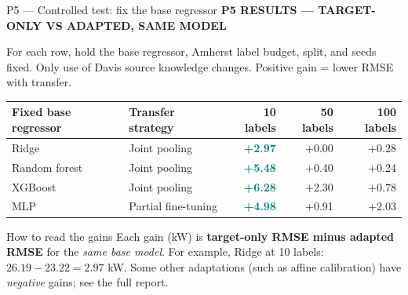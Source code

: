 \documentclass[aspectratio=169,11pt]{beamer}
\newcommand{\sectiontag}[1]{{\footnotesize\usebeamercolor[fg]{structure}\textbf{#1}}\par\vspace{0.10cm}}
\newcommand{\smallmuted}[1]{{\footnotesize\color{slate}#1\par}}
\begin{document}
\begin{frame}{P5 — Controlled test: fix the base regressor}
\sectiontag{P5 \quad RESULTS — TARGET-ONLY VS ADAPTED, SAME MODEL}
\smallmuted{For each row, hold the base regressor, Amherst label budget, split, and seeds fixed. Only use of Davis source knowledge changes. Positive gain = lower RMSE with transfer.}
\vspace{0.17cm}
{\footnotesize\setlength{\tabcolsep}{8pt}\renewcommand{\arraystretch}{1.44}
\begin{tabular}{@{}llrrr@{}}\toprule
\textbf{Fixed base regressor} & \textbf{Transfer strategy} & \textbf{10 labels} & \textbf{50 labels} & \textbf{100 labels}\\\midrule
Ridge & Joint pooling & \textcolor{teal}{\textbf{+2.97}} & +0.00 & +0.28\\
Random forest & Joint pooling & \textcolor{teal}{\textbf{+5.48}} & +0.40 & +0.24\\
XGBoost & Joint pooling & \textcolor{teal}{\textbf{+6.28}} & +2.30 & +0.78\\
MLP & Partial fine-tuning & \textcolor{teal}{\textbf{+4.98}} & +0.91 & +2.03\\
\bottomrule\end{tabular}}
\vspace{0.20cm}
\begin{block}{How to read the gains}
\footnotesize Each gain (kW) is \textbf{target-only RMSE minus adapted RMSE} for the \emph{same base model}. For example, Ridge at 10 labels: $26.19 - 23.22 = 2.97$ kW. Some other adaptations (such as affine calibration) have \emph{negative} gains; see the full report.
\end{block}
\end{frame}
\end{document}
